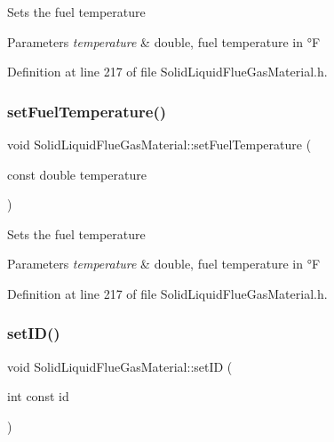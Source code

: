 Sets the fuel temperature 
\begin{DoxyParams}{Parameters}
{\em temperature} & double, fuel temperature in °F \\
\hline
\end{DoxyParams}


Definition at line 217 of file Solid\+Liquid\+Flue\+Gas\+Material.\+h.

\mbox{\label{class_solid_liquid_flue_gas_material_a420ba1234c5f8c4b93f190b61046a589}} 
\subsubsection{\texorpdfstring{set\+Fuel\+Temperature()}{setFuelTemperature()}\hspace{0.1cm}{\footnotesize\ttfamily [3/3]}}
{\footnotesize\ttfamily void Solid\+Liquid\+Flue\+Gas\+Material\+::set\+Fuel\+Temperature (\begin{DoxyParamCaption}\item[{const double}]{temperature }\end{DoxyParamCaption})\hspace{0.3cm}{\ttfamily [inline]}}

Sets the fuel temperature 
\begin{DoxyParams}{Parameters}
{\em temperature} & double, fuel temperature in °F \\
\hline
\end{DoxyParams}


Definition at line 217 of file Solid\+Liquid\+Flue\+Gas\+Material.\+h.

\mbox{\label{class_solid_liquid_flue_gas_material_a6046d06703bd496745121b62eab4f40f}} 
\subsubsection{\texorpdfstring{set\+I\+D()}{setID()}\hspace{0.1cm}{\footnotesize\ttfamily [1/3]}}
{\footnotesize\ttfamily void Solid\+Liquid\+Flue\+Gas\+Material\+::set\+ID (\begin{DoxyParamCaption}\item[{int const}]{id }\end{DoxyParamCaption})\hspace{0.3cm}{\ttfamily [inline]}}

